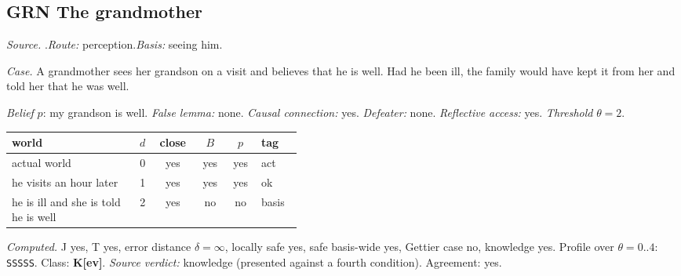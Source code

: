 \subsection*{GRN \enspace The grandmother}
\noindent\textit{Source.} \citet{Nozick1981}.\quad \textit{Route:} perception.\quad \textit{Basis:} seeing him.\par
\noindent\textit{Case.} A grandmother sees her grandson on a visit and believes that he is well. Had he been ill, the family would have kept it from her and told her that he was well.\par
\noindent\textit{Belief} $p$: my grandson is well.
 \textit{False lemma:} none. \textit{Causal connection:} yes. \textit{Defeater:} none. \textit{Reflective access:} yes. \textit{Threshold} $\theta = 2$.\par
\begin{center}\begin{tabular}{@{}p{0.43\linewidth}rcccl@{}}
world & $d$ & close & $B$ & $p$ & tag \\ \midrule
actual world & 0 & yes & yes & yes & act \\
he visits an hour later & 1 & yes & yes & yes & ok \\
he is ill and she is told he is well & 2 & yes & no & no & basis \\
\end{tabular}\end{center}
\noindent\textit{Computed.} J yes, T yes, error distance $\delta = \infty$, locally safe yes, safe basis-wide yes, Gettier case no, knowledge yes. Profile over $\theta = 0..4$: \texttt{SSSSS}. Class: \textbf{K[ev]}.
 \textit{Source verdict:} knowledge (presented against a fourth condition). Agreement: yes.
\par\medskip
{}
